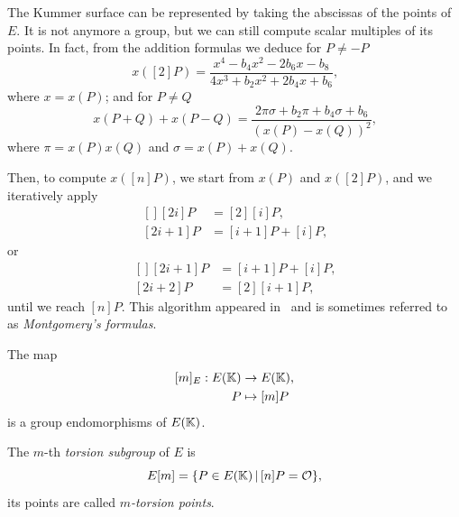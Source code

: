 \begin{remark}
  The Kummer surface can be represented by taking the abscissas of the
  points of $E$. It is not anymore a group, but we can still compute
  scalar multiples of its points. In fact, from the addition formulas
  we deduce for $P\ne-P$
  \begin{equation}
    \label{eq:128}
    x([2]P) = \frac{x^4-b_4x^2-2b_6x-b_8}{4x^3+b_2x^2+2b_4x+b_6}
    \text{,}
  \end{equation}
  where $x=x(P)$; and for $P\ne Q$
  \begin{equation}
    \label{eq:129}
    x(P+Q) + x(P-Q) =
    \frac{2\pi\sigma + b_2\pi + b_4\sigma + b_6}{(x(P)-x(Q))^2}
    \text{,}
  \end{equation}
  where $\pi=x(P)x(Q)$ and $\sigma=x(P)+x(Q)$. 

  Then, to compute $x([n]P)$, we start from $x(P)$ and $x([2]P)$, and
  we iteratively apply
  \begin{equation}
    \label{eq:130}
    \begin{aligned}[]
      [2i]P   &= [2][i]P\text{,}\\
      [2i+1]P &= [i+1]P + [i]P\text{,}
    \end{aligned}
  \end{equation}  
  or
  \begin{equation}
    \label{eq:131}
    \begin{aligned}[]
      [2i+1]P &= [i+1]P + [i]P\text{,}\\
      [2i+2]P &= [2][i+1]P\text{,}
    \end{aligned}
  \end{equation}
  until we reach $[n]P$. This algorithm appeared
  in~\cite{montgomery87} and is sometimes referred to as
  \emph{Montgomery's formulas}.
\end{remark}

The map
\begin{equation}
  \label{eq:122}
  \begin{aligned}[]
    [m]_E : E(\K) &\ra E(\K)\text{,}\\
    P &\mapsto [m]P
  \end{aligned}
\end{equation}
is a group endomorphisms of $E(\mathbb{K})$. 

\begin{definition}
  The $m$-th \emph{torsion subgroup} of $E$ is
  \begin{equation}
    \label{eq:123}
    E[m] = \{P\in E(\mathbb{K}) \,|\, [n]P=\mathcal{O}\}
    \text{,}
  \end{equation}
  its points are called%
  \emph{$m$-torsion
    points}.
\end{definition}

